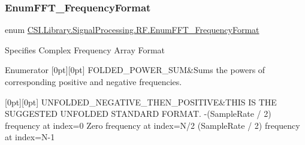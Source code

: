 \subsubsection{\texorpdfstring{EnumFFT\_FrequencyFormat}{EnumFFT\_FrequencyFormat}}
{\footnotesize\ttfamily enum \mbox{\hyperlink{namespace_c_s_i_1_1_library_1_1_signal_processing_1_1_r_f_a6fb0758cf71ddc7c43ceacbe59de3411}{C\+S\+I.\+Library.\+Signal\+Processing.\+R\+F.\+Enum\+F\+F\+T\+\_\+\+Frequency\+Format}}\hspace{0.3cm}{\ttfamily [strong]}}



Specifies Complex Frequency Array Format 

\begin{DoxyEnumFields}{Enumerator}
[0pt][0pt]{}\mbox{\label{namespace_c_s_i_1_1_library_1_1_signal_processing_1_1_r_f_a6fb0758cf71ddc7c43ceacbe59de3411ab93ba82ba3f166ed3f8d3c8805d04242}} 
F\+O\+L\+D\+E\+D\+\_\+\+P\+O\+W\+E\+R\+\_\+\+S\+UM&Sums the powers of corresponding positive and negative frequencies. \\
\hline

[0pt][0pt]{}\mbox{\label{namespace_c_s_i_1_1_library_1_1_signal_processing_1_1_r_f_a6fb0758cf71ddc7c43ceacbe59de3411a23a51530bea36f6e673bbf2a519fc067}} 
U\+N\+F\+O\+L\+D\+E\+D\+\_\+\+N\+E\+G\+A\+T\+I\+V\+E\+\_\+\+T\+H\+E\+N\+\_\+\+P\+O\+S\+I\+T\+I\+VE&T\+H\+IS IS T\+HE S\+U\+G\+G\+E\+S\+T\+ED U\+N\+F\+O\+L\+D\+ED S\+T\+A\+N\+D\+A\+RD F\+O\+R\+M\+AT. -\/(Sample\+Rate / 2) frequency at index=0 Zero frequency at index=N/2 (Sample\+Rate / 2) frequency at index=N-\/1 \\
\hline


\end{DoxyEnumFields}
